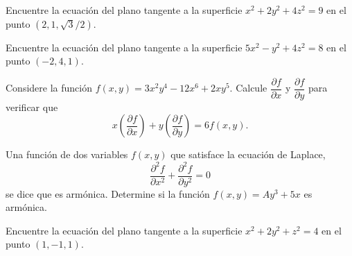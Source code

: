 \begin{prob}
Encuentre la ecuación del plano tangente a la superficie $x^2+2y^2+4z^2=9$ en el punto $(2,1,\sqrt{3}/2).$
\end{prob}

\begin{prob}
Encuentre la ecuación del plano tangente a la superficie $5x^2-y^2+4z^2=8$ en el punto $(-2,4,1).$
\end{prob}

\begin{prob}
Considere la función $f(x,y)=3x^2y^4-12x^6+2xy^5.$ Calcule $\dfrac{\partial f}{\partial x}$ y $\dfrac{\partial f}{\partial y}$ para verificar que \[  x\left( \dfrac{\partial f}{\partial x} \right)+y\left( \dfrac{\partial f}{\partial y} \right)=6f(x,y).\] 
\end{prob}

\begin{prob}
Una función de dos variables $f(x,y)$ que satisface la ecuación de Laplace, \[\dfrac{\partial^2f}{\partial x^2}+\dfrac{\partial^2f}{\partial y^2}=0\] se dice que es armónica. Determine si la función $f(x,y)=Ay^3+5x$ es armónica.
\end{prob}

\begin{prob}
Encuentre la ecuación del plano tangente a la superficie $x^2+2y^2+z^2=4$ en el punto $(1,-1,1).$
\end{prob}




